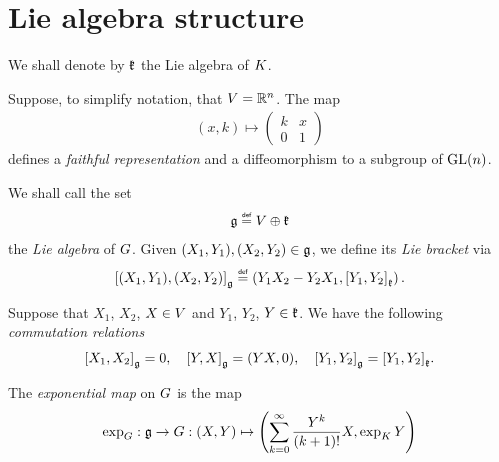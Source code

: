 \section{Lie algebra structure}

We shall denote by $\LieAlgebraCompactGroup$ the Lie algebra of $\CompactGroup$.

Suppose, to simplify notation, that $V = \R^n$.
The map
\begin{align*}
    (x, k) \mapsto
        \begin{pmatrix}
            k & x\\
            0 & 1
        \end{pmatrix}
\end{align*}
defines a \emph{faithful representation}
and a diffeomorphism to a subgroup of $\GeneralLinear n$.

\begin{definition}
    We shall call the set
    \begin{align*}
        \LieAlgebra \defeq
        \VectorSpace \oplus \LieAlgebraCompactGroup
    \end{align*}
    the \emph{Lie algebra} of $\Group$.
    Given $(X_1, Y_1), (X_2, Y_2) \in \LieAlgebra$,
    we define its \emph{Lie bracket} via
    \begin{align*}
        \LieBracket{(X_1, Y_1)}{(X_2, Y_2)}
        \defeq \left(Y_1 X_2 - Y_2 X_1, \LieBracket[\LieAlgebraCompactGroup]{Y_1}{Y_2}\right).
    \end{align*}
\end{definition}

\begin{lemma}
    Suppose that $X_1$, $X_2$, $X \in \VectorSpace$ and $Y_1$, $Y_2$, $Y \in \LieAlgebraCompactGroup$.
    We have the following \emph{commutation relations}
    \begin{align*}
        \LieBracket{X_1}{X_2} = 0,\quad
        \LieBracket{Y}{X} = (Y X, 0),\quad
        \LieBracket{Y_1}{Y_2} = \LieBracket[\LieAlgebraCompactGroup]{Y_1}{Y_2}.
    \end{align*}
\end{lemma}

\begin{definition}
\label{definition:exponential_map}
    The \emph{exponential map} on $\Group$ is the map
    \begin{align*}
        \exp_\Group : \LieAlgebra \to \Group : (X, Y) \mapsto \left(\sum_{k = 0}^\infty \frac{Y^k}{{(k + 1)}!} X, \exp_\CompactGroup Y\right)
    \end{align*}
\end{definition}

